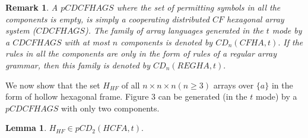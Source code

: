 \documentclass[11pt]{article}
\newtheorem{lemma}[theorem]{Lemma}
\newtheorem{remark}[theorem]{Remark}
\begin{document}
\begin{remark}A $pCDCFHAGS$ where the set of permitting symbols in all the components is empty, is simply a cooperating distributed $CF$ hexagonal array system ($CDCFHAGS$)\cite{8}. The family of array languages generated in the $t$ mode by a $CDCFHAGS$ with at most $n$ components is denoted by $CD_n(CFHA,t).$ If the rules in all the components are only in the form of rules of a regular array grammar, then this family is denoted by $CD_n(REG
HA,t).$
\end{remark}
We now show that the set $H_{HF}$ of all $n\times n\times n(n\ge
3)$ arrays over $\{a\}$ in the form of hollow hexagonal frame.
Figure 3 can be generated (in the $t$ mode) by a $pCDCFHAGS$ with
only two components.

\begin{lemma} $H_{HF}\in pCD_2(HCFA,t).$
\end{lemma}
\end{document}
